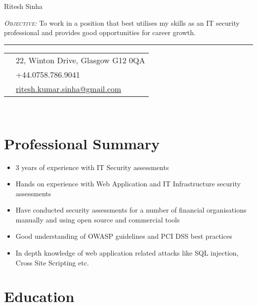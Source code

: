 \documentclass[12pt]{article}
\begin{document}
\color{text1} %

	\par{\centering
		{\sffamily\Huge Ritesh Sinha
	}\\[10pt]	
{\color{headings} 
			 \raggedright\textsc{\emph{Objective:}} To work in a position that best utilises my skills as an IT security professional and provides good opportunities for career growth. 
			\\[25pt]
			\par}
	{\color{white} \hrule} %
	
\begin{minipage}[t]{0.5\textwidth} %
\vspace{3pt} %
	
\colorbox{shade}{\textcolor{text1}{
	\begin{tabular}{c|p{8.1cm}}
								& 22, Winton Drive, Glasgow G12 0QA \\
		\raisebox{-3pt}{\Phone}  		&+44.0758.786.9041\\
		\raisebox{-3pt}{\Envelope} 	&\href{mailto:ritesh.kumar.sinha@gmail.com}
								{ritesh.kumar.sinha@gmail.com}
	\end{tabular}
	}
}\\[8pt]
\section{Professional Summary}
\normalsize {\begin{itemize}
  \item 3 years of experience with IT Security assessments
  \item Hands on experience with Web Application and IT Infrastructure security assessments
  \item Have conducted security assessments for a number of financial organisations manually and using open source and commercial tools  
  \item Good understanding of OWASP guidelines and PCI DSS best practices
  \item In depth knowledge of web application related attacks like SQL injection, Cross Site Scripting etc.
\end{itemize}} 

\section{Education}


\end{minipage}}
\end{document}
